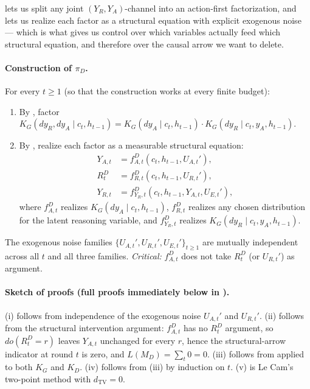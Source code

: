 \documentclass{article}
\theoremstyle{plain}
\theoremstyle{definition}
\theoremstyle{remark}
\newcommand{\TV}{\mathrm{TV}}
\newcommand{\dtv}{d_{\TV}}
\begin{document}
 lets us split any joint $(Y_R, Y_A)$-channel into an action-first
factorization, and  lets us realize each factor as a structural
equation with explicit exogenous noise --- which is what gives us control over
which variables actually feed which structural equation, and therefore over
the causal arrow we want to delete.

\paragraph{Construction of $\pi_D$.}
For every $t \ge 1$ (so that the construction works at every finite budget):
\begin{enumerate}
\item By , factor
$K_G(dy_R, dy_A \mid c_t, h_{t-1}) = K_G(dy_A \mid c_t, h_{t-1}) \cdot K_G(dy_R \mid c_t, y_A, h_{t-1})$.
\item By , realize each factor as a measurable structural equation:
\begin{align*}
Y_{A,t} &= f_{A,t}^D(c_t, h_{t-1}, U_{A,t}'),\\
R_t^D &= f_{R,t}^D(c_t, h_{t-1}, U_{R,t}'),\\
Y_{R,t} &= f_{Y_R,t}^D(c_t, h_{t-1}, Y_{A,t}, U_{E,t}'),
\end{align*}
where $f_{A,t}^D$ realizes $K_G(dy_A \mid c_t, h_{t-1})$, $f_{R,t}^D$ realizes
any chosen distribution for the latent reasoning variable, and $f_{Y_R,t}^D$
realizes $K_G(dy_R \mid c_t, y_A, h_{t-1})$.
\end{enumerate}
The exogenous noise families $\{U_{A,t}', U_{R,t}', U_{E,t}'\}_{t \ge 1}$ are
mutually independent across all $t$ and all three families. \emph{Critical:}
$f_{A,t}^D$ does not take $R_t^D$ (or $U_{R,t}'$) as argument.

\paragraph{Sketch of proofs (full proofs immediately below in ).}
(i) follows from independence of the exogenous noise $U_{A,t}'$ and $U_{R,t}'$.
(ii) follows from the structural intervention argument:
$f_{A,t}^D$ has no $R_t^D$ argument, so $\mathit{do}(R_t^D = r)$ leaves $Y_{A,t}$
unchanged for every $r$, hence the structural-arrow indicator at round $t$ is zero, and $L(M_D) = \sum_t 0 = 0$.
(iii) follows from  applied to both $K_G$ and $K_D$.
(iv) follows from (iii) by induction on $t$.
(v) is Le Cam's two-point method with $\dtv = 0$.
\end{document}
